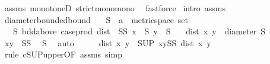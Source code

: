 \begin{isabellebody}
\ assms{\isacharparenleft}{\kern0pt}{}{\isacharparenright}{\kern0pt}\ monotoneD\ strict{\isacharunderscore}{\kern0pt}mono{\isacharunderscore}{\kern0pt}mono\ \isamarkupfalse%
\ fastforce\isanewline
{}\isamarkupfalse%
\ {\isacharparenleft}{\kern0pt}intro\ assms{\isacharparenleft}{\kern0pt}{}{\isacharparenright}{\kern0pt}{\isacharparenright}{\kern0pt}%
\endisatagproof
{\isafoldproof}%
%
\isadelimproof
\isanewline
%
\endisadelimproof
\isanewline
{}\isamarkupfalse%
\ diameter{\isacharunderscore}{\kern0pt}bounded{\isacharunderscore}{\kern0pt}bound{\isacharprime}{\kern0pt}{\isacharcolon}{\kern0pt}\isanewline
\ \ \ S\ {\isacharcolon}{\kern0pt}{\isacharcolon}{\kern0pt}\ {\isachardoublequoteopen}{\isacharprime}{\kern0pt}a\ {\isacharcolon}{\kern0pt}{\isacharcolon}{\kern0pt}\ metric{\isacharunderscore}{\kern0pt}space\ set{\isachardoublequoteclose}\isanewline
\ \ \ S{\isacharcolon}{\kern0pt}\ {\isachardoublequoteopen}bdd{\isacharunderscore}{\kern0pt}above\ {\isacharparenleft}{\kern0pt}case{\isacharunderscore}{\kern0pt}prod\ dist\ {\isacharbackquote}{\kern0pt}\ {\isacharparenleft}{\kern0pt}S{\isasymtimes}S{\isacharparenright}{\kern0pt}{\isacharparenright}{\kern0pt}{\isachardoublequoteclose}\ {\isachardoublequoteopen}x\ {\isasymin}\ S{\isachardoublequoteclose}\ {\isachardoublequoteopen}y\ {\isasymin}\ S{\isachardoublequoteclose}\isanewline
\ \ \ {\isachardoublequoteopen}dist\ x\ y\ {\isasymle}\ diameter\ S{\isachardoublequoteclose}\isanewline
%
\isadelimproof
%
\endisadelimproof
%
\isatagproof
{}\isamarkupfalse%
\ {\isacharminus}{\kern0pt}\isanewline
\ \ \isamarkupfalse%
\ {\isachardoublequoteopen}{\isacharparenleft}{\kern0pt}x{\isacharcomma}{\kern0pt}y{\isacharparenright}{\kern0pt}\ {\isasymin}\ S{\isasymtimes}S{\isachardoublequoteclose}\ \isamarkupfalse%
\ S\ \isamarkupfalse%
\ auto\isanewline
\ \ \isamarkupfalse%
\ \isamarkupfalse%
\ {\isachardoublequoteopen}dist\ x\ y\ {\isasymle}\ {\isacharparenleft}{\kern0pt}SUP\ {\isacharparenleft}{\kern0pt}x{\isacharcomma}{\kern0pt}y{\isacharparenright}{\kern0pt}{\isasymin}S{\isasymtimes}S{\isachardot}{\kern0pt}\ dist\ x\ y{\isacharparenright}{\kern0pt}{\isachardoublequoteclose}\ \isamarkupfalse%
\ {\isacharparenleft}{\kern0pt}rule\ cSUP{\isacharunderscore}{\kern0pt}upper{}{\isacharbrackleft}{\kern0pt}OF\ assms{\isacharparenleft}{\kern0pt}{}{\isacharparenright}{\kern0pt}{\isacharbrackright}{\kern0pt}{\isacharparenright}{\kern0pt}\ simp\isanewline

\end{isabellebody}
